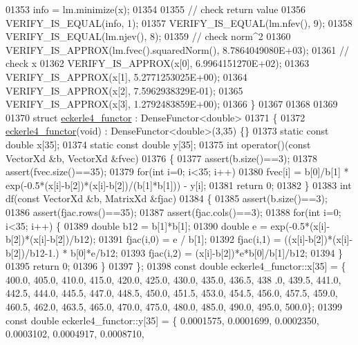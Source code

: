 \begin{DoxyCode}
01353   info = lm.minimize(x);
01354 
01355   \textcolor{comment}{// check return value}
01356   VERIFY\_IS\_EQUAL(info, 1);
01357   VERIFY\_IS\_EQUAL(lm.nfev(), 9);
01358   VERIFY\_IS\_EQUAL(lm.njev(), 8);
01359   \textcolor{comment}{// check norm^2}
01360   VERIFY\_IS\_APPROX(lm.fvec().squaredNorm(), 8.7864049080E+03);
01361   \textcolor{comment}{// check x}
01362   VERIFY\_IS\_APPROX(x[0], 6.9964151270E+02);
01363   VERIFY\_IS\_APPROX(x[1], 5.2771253025E+00);
01364   VERIFY\_IS\_APPROX(x[2], 7.5962938329E-01);
01365   VERIFY\_IS\_APPROX(x[3], 1.2792483859E+00);
01366 \}
01367 
01368 
01369 
01370 \textcolor{keyword}{struct }\hyperlink{structeckerle4__functor}{eckerle4\_functor} : DenseFunctor<double>
01371 \{
01372     \hyperlink{structeckerle4__functor}{eckerle4\_functor}(\textcolor{keywordtype}{void}) : DenseFunctor<double>(3,35) \{\}
01373     \textcolor{keyword}{static} \textcolor{keyword}{const} \textcolor{keywordtype}{double} x[35];
01374     \textcolor{keyword}{static} \textcolor{keyword}{const} \textcolor{keywordtype}{double} y[35];
01375     \textcolor{keywordtype}{int} operator()(\textcolor{keyword}{const} VectorXd &b, VectorXd &fvec)
01376     \{
01377         assert(b.size()==3);
01378         assert(fvec.size()==35);
01379         \textcolor{keywordflow}{for}(\textcolor{keywordtype}{int} i=0; i<35; i++)
01380             fvec[i] = b[0]/b[1] * exp(-0.5*(x[i]-b[2])*(x[i]-b[2])/(b[1]*b[1])) - y[i];
01381         \textcolor{keywordflow}{return} 0;
01382     \}
01383     \textcolor{keywordtype}{int} df(\textcolor{keyword}{const} VectorXd &b, MatrixXd &fjac)
01384     \{
01385         assert(b.size()==3);
01386         assert(fjac.rows()==35);
01387         assert(fjac.cols()==3);
01388         \textcolor{keywordflow}{for}(\textcolor{keywordtype}{int} i=0; i<35; i++) \{
01389             \textcolor{keywordtype}{double} b12 = b[1]*b[1];
01390             \textcolor{keywordtype}{double} e = exp(-0.5*(x[i]-b[2])*(x[i]-b[2])/b12);
01391             fjac(i,0) = e / b[1];
01392             fjac(i,1) = ((x[i]-b[2])*(x[i]-b[2])/b12-1.) * b[0]*e/b12;
01393             fjac(i,2) = (x[i]-b[2])*e*b[0]/b[1]/b12;
01394         \}
01395         \textcolor{keywordflow}{return} 0;
01396     \}
01397 \};
01398 \textcolor{keyword}{const} \textcolor{keywordtype}{double} eckerle4\_functor::x[35] = \{ 400.0, 405.0, 410.0, 415.0, 420.0, 425.0, 430.0, 435.0, 436.5, 438
      .0, 439.5, 441.0, 442.5, 444.0, 445.5, 447.0, 448.5, 450.0, 451.5, 453.0, 454.5, 456.0, 457.5, 459.0, 460.5,
       462.0, 463.5, 465.0, 470.0, 475.0, 480.0, 485.0, 490.0, 495.0, 500.0\};
01399 \textcolor{keyword}{const} \textcolor{keywordtype}{double} eckerle4\_functor::y[35] = \{ 0.0001575, 0.0001699, 0.0002350, 0.0003102, 0.0004917, 0.0008710, 

\end{DoxyCode}
